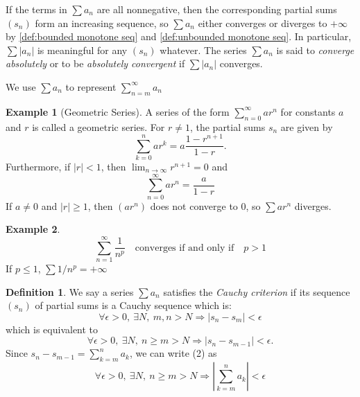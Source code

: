 \documentclass[12pt, lettersize]{book}
\theoremstyle{plain}
\theoremstyle{definition}
\newtheorem{dfn}[thm]{Definition}
\newtheorem*{eg}{Example}
\theoremstyle{remark}
\begin{document}
		If the terms in $\sum a_n$ are all nonnegative, then the corresponding partial sums $(s_n)$ form an increasing sequence, so $\sum a_n$ either converges or diverges to $+\infty$ by \ref{def:bounded monotone seq} and \ref{def:unbounded monotone seq}. In particular, $\sum |a_n|$ is meaningful for any $(s_n)$ whatever. The series
		$\sum a_n$ is said to \emph{converge absolutely} or to be \emph{absolutely convergent} if $\sum |a_n|$ converges.
		
		We use $\sum a_n$ to represent $\sum_{n=m}^{\infty}a_n$
		
		\begin{eg}[Geometric Series]
		A series of the form $\sum_{n=0}^{\infty}ar^n$ for constants $a$ and $r$ is called a geometric series. For $r\neq1$,
		the partial sums $s_n$ are given by
		\begin{displaymath}
			\sum_{k=0}^{n}ar^k=a\frac{1-r^{n+1}}{1-r}.
		\end{displaymath}
		Furthermore, if $|r|<1$, then $\lim_{n\rightarrow \infty}r^{n+1}=0$ and
		\begin{displaymath}
			\sum_{n=0}^{\infty}ar^n=\frac{a}{1-r}
		\end{displaymath}
		If $a\neq0$ and $|r|\geq1$, then $(ar^n)$ does not converge to $0$, so $\sum ar^n$ diverges.
		\end{eg}
		
		\begin{eg}
		\begin{displaymath}
			\sum_{n=1}^{\infty}\frac{1}{n^p}\quad \text{converges if and only if}\quad p>1
		\end{displaymath}
		If $p\leq1$, $\sum1/n^p=+\infty$
		\end{eg}
		
		\setcounter{equation}{0}
		\begin{dfn}\label{def:cauchy criterion}
		We say a series $\sum a_n$ satisfies the \emph{Cauchy criterion} if its sequence $(s_n)$ of partial sums is a
		Cauchy sequence which is:
		\begin{equation}
			\forall\epsilon>0,\ \exists N,\ m,n>N\Rightarrow|s_n-s_m|<\epsilon
		\end{equation}
		which is equivalent to
		\begin{equation}
			\forall\epsilon>0,\ \exists N,\ n\geq m>N\Rightarrow|s_n-s_{m-1}|<\epsilon.
		\end{equation}
		Since $s_n-s_{m-1}=\sum_{k=m}^{n}a_k$, we can write (2) as
		\begin{equation}
			\forall\epsilon>0,\ \exists N,\ n\geq m>N\Rightarrow\left|\sum_{k=m}^{n}a_k\right|<\epsilon
		\end{equation}
		\end{dfn}
		
\end{document}
